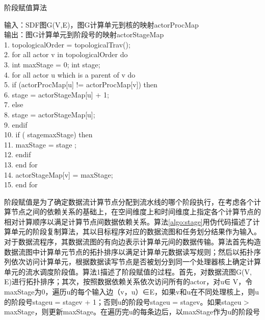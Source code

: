 \begin{algorithm}
  \caption{阶段赋值算法}
  \label{algo:stage}
  输入：SDF图G(V,E)，图G计算单元到核的映射actorProcMap\\
  输出：图G计算单元到阶段号的映射actorStageMap\\
  1.	topologicalOrder = topologicalTrav();\\
  2.	for all actor v in topologicalOrder do\\
  3.	  \hspace*{1 pc} int maxStage = 0; int stage;\\
  4.	  \hspace*{1 pc} for all actor u which is a parent of v do\\
  5.	    \hspace*{2 pc} if (actorProcMap[u] != actorProcMap[v]) then\\
  6.	    \hspace*{3 pc}   stage = actorStageMap[u] + 1;\\
  7.	    \hspace*{2 pc} else\\
  8.	    \hspace*{3 pc}   stage = actorStageMap[u];\\
  9.	    \hspace*{2 pc} endif\\
  10.	    \hspace*{2 pc} if ( stagemaxStage) then\\
  11.	    \hspace*{3 pc}   maxStage = stage ;\\
  12.	    \hspace*{2 pc} endif\\
  13.	  \hspace*{1 pc} end for\\
  14.	  \hspace*{1 pc} actorStageMap[v] = maxStage;\\
  15.	 end for
\end{algorithm}

阶段赋值是为了确定数据流计算节点分配到流水线的哪个阶段执行，在考虑各个计算节点之间的依赖关系的基础上，在空间维度上和时间维度上指定各个计算节点的相对计算顺序以满足计算节点间数据依赖关系。算法\ref{algo:stage}用伪代码描述了计算单元的阶段复制算法，其以目标程序对应的数据流图和任务划分结果作为输入。对于数据流程序，其数据流图的有向边表示计算单元间的数据传输。算法首先构造数据流图中计算单元节点的拓扑排序以满足计算单元数据读写规则；然后以拓扑序列依次访问计算单元，根据数据读写节点是否被划分到同一个处理器核上确定计算单元的流水调度阶段值。算法1描述了阶段赋值的过程。首先，对数据流图G(V, E)进行拓扑排序；其次，按照数据依赖关系依次访问所有的actor，对u∈ V，令maxStage为0，遍历u的每个输入边（v，u）∈E，如果v和u在不同处理核上，则u的阶段号stageu = stagev + 1；否则u的阶段号stageu = stagev。如果stageu > maxStage，则更新maxStage。在遍历完u的每条边后，以maxStage作为u的阶段号

